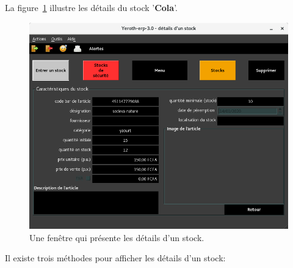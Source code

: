 \newpage
{}

La figure~\ref{fig:fenetre-details-stock} illustre
les d\'etails du stock '\textbf{Cola}'.\\

\begin{figure}[!htbp]
	\centering
	\includegraphics[scale=0.63]{images/yeren-fenetre-detail-stock.png}
	\caption{Une fen\^etre qui pr\'esente les d\'etails d'un stock.}
	\label{fig:fenetre-details-stock}
\end{figure}

Il existe trois m\'ethodes pour afficher les d\'etails
d'un stock:

